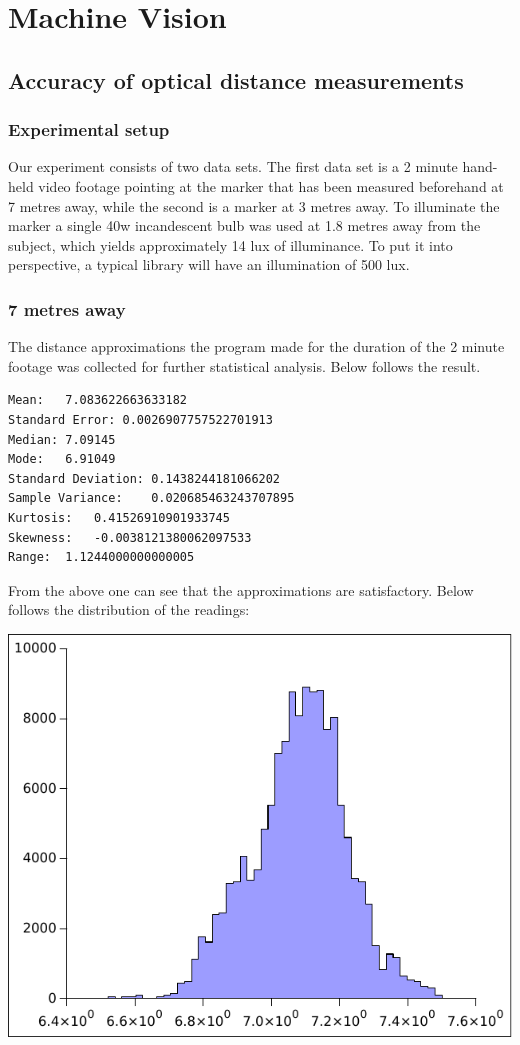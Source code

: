 \section{Machine Vision}
\subsection{Accuracy of optical distance measurements}
\subsubsection{Experimental setup}
Our experiment consists of two data sets. The first data set is a 2 minute hand-held video footage pointing at the marker that has been measured beforehand at 7 metres away, while the second is a marker at 3 metres away. To illuminate the marker a single 40w incandescent bulb was used at 1.8 metres away from the subject, which yields approximately 14 lux of illuminance. To put it into perspective, a typical library will have an illumination of 500 lux.
\subsubsection{7 metres away}
The distance approximations the program made for the duration of the 2 minute footage was collected for further statistical analysis. Below follows the result.
\begin{verbatim}
Mean:	7.083622663633182
Standard Error:	0.0026907757522701913
Median:	7.09145
Mode:	6.91049
Standard Deviation:	0.1438244181066202
Sample Variance:	0.020685463243707895
Kurtosis:	0.41526910901933745
Skewness:	-0.0038121380062097533
Range:	1.1244000000000005
\end{verbatim}
From the above one can see that the approximations are satisfactory. Below follows the distribution of the readings:\par
\includegraphics[]{machine_vision/data/7metres.pdf}
